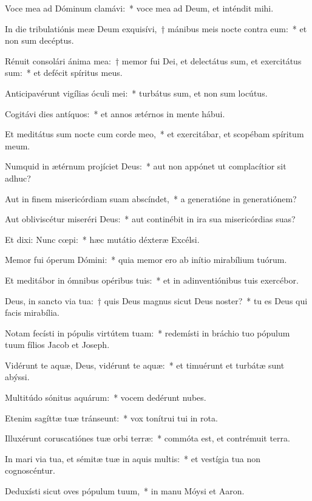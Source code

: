\item Voce mea ad Dóminum clamávi:~* voce mea ad Deum, et inténdit mihi.

\item In die tribulatiónis meæ Deum exquisívi,~† mánibus meis nocte contra eum:~* et non sum decéptus.

\item Rénuit consolári ánima mea:~† memor fui Dei, et delectátus sum, et exercitátus sum:~* et defécit spíritus meus.

\item Anticipavérunt vigílias óculi mei:~* turbátus sum, et non sum locútus.

\item Cogitávi dies antíquos:~* et annos ætérnos in mente hábui.

\item Et meditátus sum nocte cum corde meo,~* et exercitábar, et scopébam spíritum meum.

\item Numquid in ætérnum projíciet Deus:~* aut non appónet ut complacítior sit adhuc?

\item Aut in finem misericórdiam suam abscíndet,~* a generatióne in generatiónem?

\item Aut obliviscétur miseréri Deus:~* aut continébit in ira sua misericórdias suas?

\item Et dixi: Nunc cœpi:~* hæc mutátio déxteræ Excélsi.

\item Memor fui óperum Dómini:~* quia memor ero ab inítio mirabílium tuórum.

\item Et meditábor in ómnibus opéribus tuis:~* et in adinventiónibus tuis exercébor.

\item Deus, in sancto via tua:~† quis Deus magnus sicut Deus noster?~* tu es Deus qui facis mirabília.

\item Notam fecísti in pópulis virtútem tuam:~* redemísti in bráchio tuo pópulum tuum fílios Jacob et Joseph.

\item Vidérunt te aquæ, Deus, vidérunt te aquæ:~* et timuérunt et turbátæ sunt abýssi.

\item Multitúdo sónitus aquárum:~* vocem dedérunt nubes.

\item Etenim sagíttæ tuæ tránseunt:~* vox tonítrui tui in rota.

\item Illuxérunt coruscatiónes tuæ orbi terræ:~* commóta est, et contrémuit terra.

\item In mari via tua, et sémitæ tuæ in aquis multis:~* et vestígia tua non cognoscéntur.

\item Deduxísti sicut oves pópulum tuum,~* in manu Móysi et Aaron.

